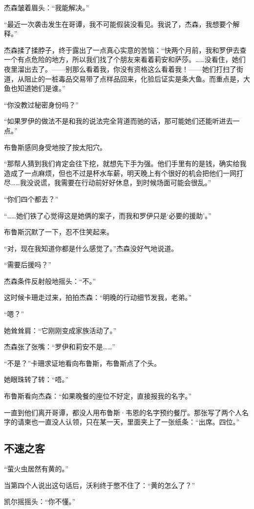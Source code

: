 \documentclass[../main]{subfiles}
\begin{document}
杰森皱着眉头：“我能解决。”

“最近一次袭击发生在哥谭，我不可能假装没看见。我说了，杰森，我想要个解释。”

杰森揉了揉脖子，终于露出了一点真心实意的苦恼：“快两个月前，我和罗伊去查一个有点危险的地方，所以我们找了个朋友来看着莉安和萨莎。……没看住，她们夜里溜出去了。——别那么看着我，你没有资格这么看着我！——她们打扫了街道，从阻止的一桩毒品交易带了点样品回来，化验后证实是条大鱼。而重点是，大鱼也知道她们是谁。”

“你没教过秘密身份吗？”

“如果罗伊的做法不是和我的说法完全背道而驰的话，那可能她们还能听进去一点。”

布鲁斯感同身受地按了按太阳穴。

“那帮人猜到我们肯定会往下挖，就想先下手为强。他们手里有的是钱，确实给我造成了一点麻烦，但也不过是杯水车薪，明天晚上有个很好的机会把他们一网打尽……我没说谎，我需要在行动前好好休息，到时候场面可能会很乱。”

“你们四个都去？”

“……她们铁了心觉得这是她俩的案子，而我和罗伊只是‘必要的援助’。”

布鲁斯沉默了一下，忍不住笑起来。

“对，现在我知道你都是什么感觉了。”杰森没好气地说道。

“需要后援吗？”

杰森条件反射般地摇头：“不。”

这时候卡珊走过来，拍拍杰森：“明晚的行动细节发我，老弟。”

“嗯？”

她耸耸肩：“它刚刚变成家族活动了。”

杰森张了张嘴：“罗伊和莉安不是……”

“不是？”卡珊求证地看向布鲁斯，布鲁斯点了个头。

她眼珠转了转：“唔。”

布鲁斯看向杰森：“如果晚餐的座位不好定，直接报我的名字。”

一直到他们离开哥谭，都没人用布鲁斯·韦恩的名字预约餐厅。那张写了两个人名字的请柬也一直没人认领，只在某一天，里面夹上了一张纸条：“出席。四位。”

\subsection{不速之客}

“萤火虫居然有黄的。”

当第四个人说出这句话后，沃利终于憋不住了：“黄的怎么了？”

凯尔摇摇头：“你不懂。”
\end{document}
